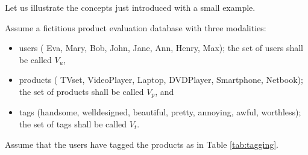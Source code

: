 \documentclass{fundam}
\newcommand{\N}{ V }
\begin{document}
\begin{example}\label{ex:leading} %
Let us illustrate the concepts just introduced with a small example.

\medskip
Assume a fictitious product evaluation database with three modalities:
\begin{itemize}
\itemsep=0.95pt
\item  users (	 		Eva, 	Mary, Bob, John,	Jane, Ann,	 Henry,	Max); the set of users shall be called $\N_u$,
\item  products (			TVset,
			VideoPlayer,
			Laptop,
			DVDPlayer,
			Smartphone,
			Netbook);  the set of products shall be called $\N_p$,
and \item  tags (handsome,
			welldesigned,
			beautiful,
			pretty,
			annoying,
			awful,
			worthless);  the set of tags shall be called $\N_t$.
\end{itemize}

Assume that the users have tagged the products as in Table \ref{tab:tagging}.


\end{example}
\end{document}
